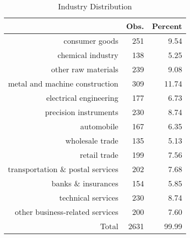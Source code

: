 \begin{table}[ht]
\centering
\caption{Industry Distribution} 
\begin{tabular}{rrr}
  \hline
 & Obs. & Percent \\ 
  \hline
consumer goods & 251 & 9.54 \\ 
  chemical industry & 138 & 5.25 \\ 
  other raw materials & 239 & 9.08 \\ 
  metal and machine construction & 309 & 11.74 \\ 
  electrical engineering & 177 & 6.73 \\ 
  precision instruments & 230 & 8.74 \\ 
  automobile & 167 & 6.35 \\ 
  wholesale trade & 135 & 5.13 \\ 
  retail trade & 199 & 7.56 \\ 
  transportation \& postal services & 202 & 7.68 \\ 
  banks \& insurances & 154 & 5.85 \\ 
  technical services & 230 & 8.74 \\ 
  other business-related services & 200 & 7.60 \\ 
  Total & 2631 & 99.99 \\ 
   \hline
\end{tabular}
\end{table}
